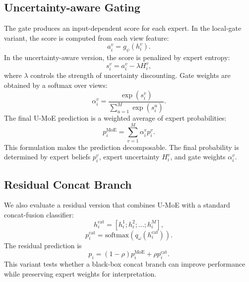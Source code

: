 ﻿\documentclass[conference]{IEEEtran}
\newcommand{\method}{U-MoE}
\begin{document}
\subsection{Uncertainty-aware Gating}
The gate produces an input-dependent score for each expert. In the local-gate variant, the score is computed from each view feature:
\begin{equation}
a_i^v = g_\psi(h_i^v).
\end{equation}
In the uncertainty-aware version, the score is penalized by expert entropy:
\begin{equation}
s_i^v = a_i^v - \lambda H_i^v,
\end{equation}
where $\lambda$ controls the strength of uncertainty discounting. Gate weights are obtained by a softmax over views:
\begin{equation}
\alpha_i^v = \frac{\exp(s_i^v)}{\sum_{u=1}^{M}\exp(s_i^u)}.
\end{equation}
The final \method{} prediction is a weighted average of expert probabilities:
\begin{equation}
p_i^{\mathrm{MoE}} = \sum_{v=1}^{M}\alpha_i^v p_i^v.
\end{equation}
This formulation makes the prediction decomposable. The final probability is determined by expert beliefs $p_i^v$, expert uncertainty $H_i^v$, and gate weights $\alpha_i^v$.

\subsection{Residual Concat Branch}
We also evaluate a residual version that combines \method{} with a standard concat-fusion classifier:
\begin{equation}
h_i^{\mathrm{cat}} = [h_i^1;h_i^2;\ldots;h_i^M],
\end{equation}
\begin{equation}
p_i^{\mathrm{cat}} = \mathrm{softmax}(q_\omega(h_i^{\mathrm{cat}})).
\end{equation}
The residual prediction is
\begin{equation}
p_i = (1-\rho)p_i^{\mathrm{MoE}} + \rho p_i^{\mathrm{cat}}.
\end{equation}
This variant tests whether a black-box concat branch can improve performance while preserving expert weights for interpretation.
\end{document}
